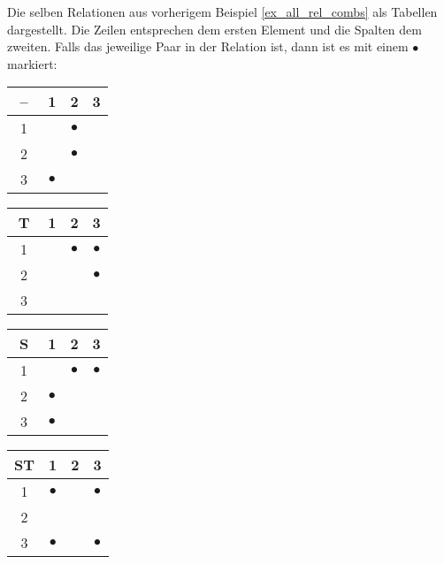 \begin{example} 
    \newcommand{\h}{$\bullet$} \newcommand{\p}{$\ \ $}
    Die selben Relationen aus vorherigem Beispiel \ref{ex_all_rel_combs} als Tabellen dargestellt. Die Zeilen entsprechen dem ersten Element und die Spalten dem zweiten. Falls das jeweilige Paar in der Relation ist, dann ist es mit einem  \h$\ $  markiert:
\begin{table}[!htbp]
    \centering
    \begin{tabular}{c|c c c}
        --   &   1   &   2   &   3 \\
        \hline
     \p 1\p &       &   \h    &       \\
        2   &       &   \h    &       \\
        3   &   \h    &       &       \\
    \end{tabular}\quad
    \begin{tabular}{c|c c c}
        T   &   1   &   2   &   3 \\
        \hline
     \p 1\p &       &   \h    &   \h    \\
        2   &       &       &    \h   \\
        3   &       &       &       \\
    \end{tabular}\quad
    \begin{tabular}{c|c c c}
        S   &   1   &   2   &   3 \\
        \hline
     \p 1\p &       &   \h    &   \h    \\
        2   &  \h     &       &     \\
        3   &   \h    &       &       \\
    \end{tabular}\quad
    \begin{tabular}{c|c c c}
        ST  &   1   &   2   &   3 \\
        \hline
     \p 1\p &   \h    &       &    \h    \\
        2   &       &       &        \\
        3   &   \h    &       &   \h    \\
    \end{tabular}
\end{table}


\end{example}
